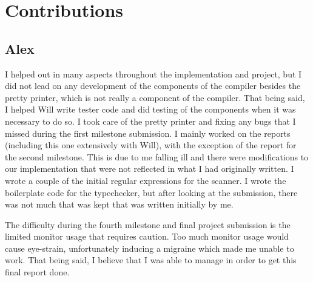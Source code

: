 \documentclass{article}
\begin{document}


\section{Contributions}

\subsection{Alex}

I helped out in many aspects throughout the implementation and project, but I did not lead on any development of the components of the compiler besides the pretty printer, which is not really a component of the compiler. That being said, I helped Will write tester code and did testing of the components when it was necessary to do so. I took care of the pretty printer and fixing any bugs that I missed during the first milestone submission. I mainly worked on the reports (including this one extensively with Will), with the exception of the report for the second milestone. This is due to me falling ill and there were modifications to our implementation that were not reflected in what I had originally written. I wrote a couple of the initial regular expressions for the scanner. I wrote the boilerplate code for the typechecker, but after looking at the submission, there was not much that was kept that was written initially by me.

The difficulty during the fourth milestone and final project submission is the limited monitor usage that requires caution. Too much monitor usage would cause eye-strain, unfortunately inducing a migraine which made me unable to work. That being said, I believe that I was able to manage in order to get this final report done.
\end{document}
